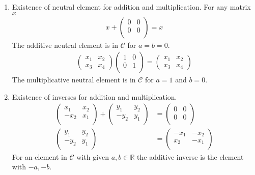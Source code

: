 \documentclass{article}
\begin{document}
\begin{enumerate}
\begin{enumerate}[label={(\roman*)}]
        \item Existence of neutral element for addition and multiplication. For any matrix $x$
        \begin{align*}
            x + \begin{pmatrix}
                0 & 0 \\ 0 & 0 \\
            \end{pmatrix} = x
        \end{align*}
        The additive neutral element is in $\mathcal{C}$ for $a = b = 0$.
        \begin{align*}
            \begin{pmatrix}
                x_1 & x_2 \\ x_3 & x_4
            \end{pmatrix} \begin{pmatrix}
                1 & 0 \\
                0 & 1 \\
            \end{pmatrix} = \begin{pmatrix}
                x_1 & x_2 \\ x_3 & x_4
            \end{pmatrix} 
        \end{align*}
        The multiplicative neutral element is in $\mathcal{C}$ for $a = 1$ and $b = 0$.

        \item Existence of inverses for addition and multiplication.
        \begin{align*}
            \begin{pmatrix}
                x_1 & x_2 \\ -x_2 & x_1 \\
            \end{pmatrix} +
            \begin{pmatrix}
                y_1 & y_2 \\ -y_2 & y_1 \\
            \end{pmatrix} &=
            \begin{pmatrix}
                0 & 0 \\ 0 & 0 \\
            \end{pmatrix} \\
            \begin{pmatrix}
                y_1 & y_2 \\ -y_2 & y_1 \\
            \end{pmatrix} &=
            \begin{pmatrix}
                -x_1 & -x_2 \\ x_2 & -x_1 \\
            \end{pmatrix}
        \end{align*}
        For an element in $\mathcal{C}$ with given $a, b \in \mathbb{R}$ the additive inverse is the element with $-a, -b$.


\end{enumerate}
\end{enumerate}
\end{document}
